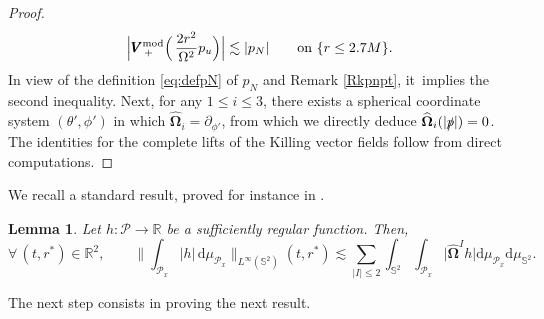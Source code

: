 \documentclass[JEP,XML,SOM,Unicode,published]{cedram}
\theoremstyle{plain}
\newtheorem{lemma}[proposition]{Lemma}
\theoremstyle{definition}
\newcommand\R{{\mathbb{R}}}
\newcommand\dr{{\mathrm{d}}}
\begin{document}
\begin{proof}
\[
\Big| \pmb{V}_{\, +}^{ \mathrm{mod}} \Bigl(\, \frac{2r^2 }{\Omega^2}p_u \Bigr) \Big| \lesssim |p_N| \qquad \text{on $\{ r \leq 2.7M \}$}.
\]
In view of the definition \eqref{eq:defpN} of $p_N$ and Remark \ref{Rkpnpt}, it~implies the second inequality. Next, for any $1 \leq i \leq 3$, there exists a spherical coordinate system $(\theta',\phi')$ in which $\widehat{\mathbf{\Omega}}_i=\partial_{\phi'}$, from which we directly deduce $\widehat{\mathbf{\Omega}}_i(|\slashed{p}|)=0$. The identities for the complete lifts of the Killing vector fields follow from direct computations.
\end{proof}

\pagebreak[2]
We recall a standard result, proved for instance in \cite[Lem.\,5.2]{L23}.

\begin{lemma}\label{Sobsphere}
Let $h : \mathcal{P} \to \R$ be a sufficiently regular function. Then,
\[
\forall \, (t,r^*) \in \R^2, \qquad \biggl\| \int_{\mathcal{P}_x} |h| \, \dr \mu_{\mathcal{P}_x} \biggr\|_{L^\infty(\mathbb{S}^2)}(t,r^*) \lesssim \sum_{|I| \leq 2} \int_{\mathbb{S}^2} \int_{\mathcal{P}_x} \big| \widehat{\mathbf{\Omega}}^I h \big| \dr \mu_{\mathcal{P}_x} \dr \mu_{\mathbb{S}^2}.
\]
\end{lemma}

The next step consists in proving the next result.
\end{document}
